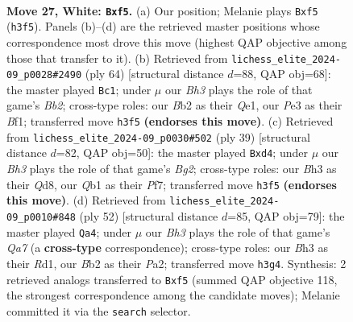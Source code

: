 \documentclass[11pt]{article}
\begin{document}
\clearpage

\begin{figure}[p]\centering
\begin{subfigure}{0.46\textwidth}\centering
\resizebox{\linewidth}{!}{%
\newchessgame
\chessboard[
  setfen={rqb1k2r/p3b1pp/8/np1p1p2/P2P3P/4P1PB/1B1N2K1/1Q2R3 w - - 0 27},
  showmover=false,
  pgfstyle=straightmove, color=movearrow, markmove={h3-f5}
]}
\caption{}
\end{subfigure}\hfill
\begin{subfigure}{0.46\textwidth}\centering
\resizebox{\linewidth}{!}{%
\newchessgame
\chessboard[
  setfen={3qr1k1/5pb1/b5pp/7n/3pPP2/3P1N1P/1BR5/4QBK1 w - - 1 33},
  showmover=false,
  pgfstyle=straightmove, color=movearrow, markmove={b2-c1}
]}
\caption{}
\end{subfigure}
\\[4pt]
\begin{subfigure}{0.46\textwidth}\centering
\resizebox{\linewidth}{!}{%
\newchessgame
\chessboard[
  setfen={3qr1k1/p4pbp/2p3p1/2P5/2PP2b1/5p2/PQ1N1P2/2KR1B1R b - - 0 20},
  showmover=false,
  pgfstyle=straightmove, color=movearrow, markmove={g7-d4}
]}
\caption{}
\end{subfigure}\hfill
\begin{subfigure}{0.46\textwidth}\centering
\resizebox{\linewidth}{!}{%
\newchessgame
\chessboard[
  setfen={3r3k/Q1p2rb1/1p4pp/3p1q2/5P2/2P3PP/PP4B1/3RR2K w - - 1 27},
  showmover=false,
  pgfstyle=straightmove, color=movearrow, markmove={a7-a4}
]}
\caption{}
\end{subfigure}
\caption{\textbf{Move 27, White: \texttt{Bxf5}.} (a) Our position; Melanie plays \texttt{Bxf5} (\texttt{h3f5}). Panels (b)--(d) are the retrieved master positions whose correspondence most drove this move (highest QAP objective among those that transfer to it). (b) Retrieved from \texttt{lichess\_elite\_2024-09\_p0028\#2490} (ply 64) [structural distance $d$=88, QAP obj=68]: the master played \texttt{Bc1}; under $\mu$ our \emph{Bh3} plays the role of that game's \emph{Bb2}; cross-type roles: our \emph{B}b2 as their \emph{Q}e1, our \emph{P}e3 as their \emph{B}f1; transferred move \texttt{h3f5} \textbf{(endorses this move)}. (c) Retrieved from \texttt{lichess\_elite\_2024-09\_p0030\#502} (ply 39) [structural distance $d$=82, QAP obj=50]: the master played \texttt{Bxd4}; under $\mu$ our \emph{Bh3} plays the role of that game's \emph{Bg2}; cross-type roles: our \emph{B}h3 as their \emph{Q}d8, our \emph{Q}b1 as their \emph{P}f7; transferred move \texttt{h3f5} \textbf{(endorses this move)}. (d) Retrieved from \texttt{lichess\_elite\_2024-09\_p0010\#848} (ply 52) [structural distance $d$=85, QAP obj=79]: the master played \texttt{Qa4}; under $\mu$ our \emph{Bh3} plays the role of that game's \emph{Qa7} (a \textbf{cross-type} correspondence); cross-type roles: our \emph{B}h3 as their \emph{R}d1, our \emph{B}b2 as their \emph{P}a2; transferred move \texttt{h3g4}. Synthesis: 2 retrieved analogs transferred to \texttt{Bxf5} (summed QAP objective 118, the strongest correspondence among the candidate moves); Melanie committed it via the \texttt{search} selector.}
\label{fig:thought-m52}
\end{figure}
\end{document}
